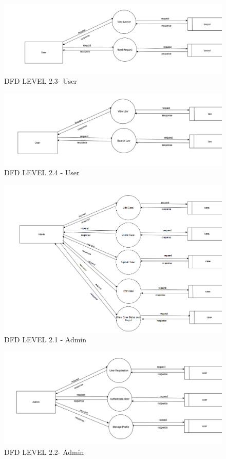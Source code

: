 \begin{figure}
  \centering
  \includegraphics[width=0.8\linewidth]{User2.3lawyer.png}
 \caption{DFD LEVEL 2.3- User}
   \label{fig:DFD LEVEL 2.3 - User}
\end{figure}

\begin{figure}
  \centering
  \includegraphics[width=0.8\linewidth]{User2.4law.png}
 \caption{DFD LEVEL 2.4 - User}
   \label{fig:DFD LEVEL 2.4 - User}
\end{figure}

\begin{figure}
  \centering
  \includegraphics[width=0.8\linewidth]{Admin2.1case.png}
 \caption{DFD LEVEL 2.1 - Admin}
   \label{fig:DFD LEVEL 2.1 - Admin}
\end{figure}

\begin{figure}
  \centering
  \includegraphics[width=0.8\linewidth]{Admin2.2user.png}
 \caption{DFD LEVEL 2.2- Admin}
   \label{fig:DFD LEVEL 2.2 - Admin}
\end{figure}

